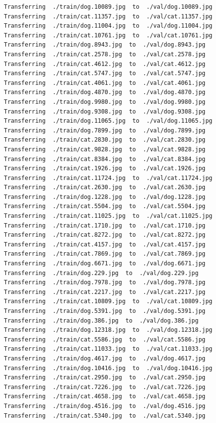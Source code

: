 \documentclass[]{book}
\theoremstyle{definition}
\theoremstyle{definition}
\theoremstyle{definition}
\theoremstyle{remark}
\begin{document}
\begin{verbatim}
Transferring  ./train/dog.10089.jpg  to  ./val/dog.10089.jpg
Transferring  ./train/cat.11357.jpg  to  ./val/cat.11357.jpg
Transferring  ./train/dog.11004.jpg  to  ./val/dog.11004.jpg
Transferring  ./train/cat.10761.jpg  to  ./val/cat.10761.jpg
Transferring  ./train/dog.8943.jpg  to  ./val/dog.8943.jpg
Transferring  ./train/cat.2578.jpg  to  ./val/cat.2578.jpg
Transferring  ./train/cat.4612.jpg  to  ./val/cat.4612.jpg
Transferring  ./train/cat.5747.jpg  to  ./val/cat.5747.jpg
Transferring  ./train/cat.4061.jpg  to  ./val/cat.4061.jpg
Transferring  ./train/dog.4870.jpg  to  ./val/dog.4870.jpg
Transferring  ./train/dog.9980.jpg  to  ./val/dog.9980.jpg
Transferring  ./train/dog.9308.jpg  to  ./val/dog.9308.jpg
Transferring  ./train/dog.11065.jpg  to  ./val/dog.11065.jpg
Transferring  ./train/dog.7899.jpg  to  ./val/dog.7899.jpg
Transferring  ./train/cat.2830.jpg  to  ./val/cat.2830.jpg
Transferring  ./train/cat.9828.jpg  to  ./val/cat.9828.jpg
Transferring  ./train/cat.8384.jpg  to  ./val/cat.8384.jpg
Transferring  ./train/cat.1926.jpg  to  ./val/cat.1926.jpg
Transferring  ./train/cat.11724.jpg  to  ./val/cat.11724.jpg
Transferring  ./train/cat.2630.jpg  to  ./val/cat.2630.jpg
Transferring  ./train/dog.1228.jpg  to  ./val/dog.1228.jpg
Transferring  ./train/cat.5504.jpg  to  ./val/cat.5504.jpg
Transferring  ./train/cat.11025.jpg  to  ./val/cat.11025.jpg
Transferring  ./train/cat.1710.jpg  to  ./val/cat.1710.jpg
Transferring  ./train/cat.8272.jpg  to  ./val/cat.8272.jpg
Transferring  ./train/cat.4157.jpg  to  ./val/cat.4157.jpg
Transferring  ./train/cat.7869.jpg  to  ./val/cat.7869.jpg
Transferring  ./train/dog.6671.jpg  to  ./val/dog.6671.jpg
Transferring  ./train/dog.229.jpg  to  ./val/dog.229.jpg
Transferring  ./train/dog.7978.jpg  to  ./val/dog.7978.jpg
Transferring  ./train/cat.2217.jpg  to  ./val/cat.2217.jpg
Transferring  ./train/cat.10809.jpg  to  ./val/cat.10809.jpg
Transferring  ./train/dog.5391.jpg  to  ./val/dog.5391.jpg
Transferring  ./train/dog.386.jpg  to  ./val/dog.386.jpg
Transferring  ./train/dog.12318.jpg  to  ./val/dog.12318.jpg
Transferring  ./train/cat.5586.jpg  to  ./val/cat.5586.jpg
Transferring  ./train/cat.11033.jpg  to  ./val/cat.11033.jpg
Transferring  ./train/dog.4617.jpg  to  ./val/dog.4617.jpg
Transferring  ./train/dog.10416.jpg  to  ./val/dog.10416.jpg
Transferring  ./train/cat.2950.jpg  to  ./val/cat.2950.jpg
Transferring  ./train/cat.7226.jpg  to  ./val/cat.7226.jpg
Transferring  ./train/cat.4658.jpg  to  ./val/cat.4658.jpg
Transferring  ./train/dog.4516.jpg  to  ./val/dog.4516.jpg
Transferring  ./train/cat.5340.jpg  to  ./val/cat.5340.jpg

\end{verbatim}
\end{document}
